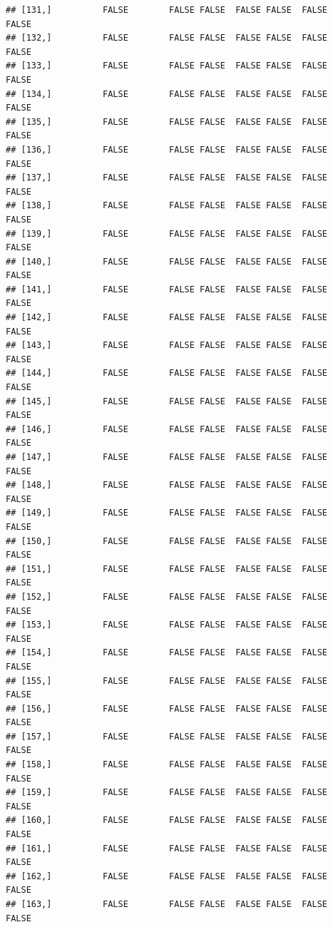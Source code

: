 \documentclass[
  english,
  man,floatsintext]{apa6}
\begin{document}
\begin{verbatim}
## [131,]          FALSE        FALSE FALSE  FALSE FALSE  FALSE            FALSE
## [132,]          FALSE        FALSE FALSE  FALSE FALSE  FALSE            FALSE
## [133,]          FALSE        FALSE FALSE  FALSE FALSE  FALSE            FALSE
## [134,]          FALSE        FALSE FALSE  FALSE FALSE  FALSE            FALSE
## [135,]          FALSE        FALSE FALSE  FALSE FALSE  FALSE            FALSE
## [136,]          FALSE        FALSE FALSE  FALSE FALSE  FALSE            FALSE
## [137,]          FALSE        FALSE FALSE  FALSE FALSE  FALSE            FALSE
## [138,]          FALSE        FALSE FALSE  FALSE FALSE  FALSE            FALSE
## [139,]          FALSE        FALSE FALSE  FALSE FALSE  FALSE            FALSE
## [140,]          FALSE        FALSE FALSE  FALSE FALSE  FALSE            FALSE
## [141,]          FALSE        FALSE FALSE  FALSE FALSE  FALSE            FALSE
## [142,]          FALSE        FALSE FALSE  FALSE FALSE  FALSE            FALSE
## [143,]          FALSE        FALSE FALSE  FALSE FALSE  FALSE            FALSE
## [144,]          FALSE        FALSE FALSE  FALSE FALSE  FALSE            FALSE
## [145,]          FALSE        FALSE FALSE  FALSE FALSE  FALSE            FALSE
## [146,]          FALSE        FALSE FALSE  FALSE FALSE  FALSE            FALSE
## [147,]          FALSE        FALSE FALSE  FALSE FALSE  FALSE            FALSE
## [148,]          FALSE        FALSE FALSE  FALSE FALSE  FALSE            FALSE
## [149,]          FALSE        FALSE FALSE  FALSE FALSE  FALSE            FALSE
## [150,]          FALSE        FALSE FALSE  FALSE FALSE  FALSE            FALSE
## [151,]          FALSE        FALSE FALSE  FALSE FALSE  FALSE            FALSE
## [152,]          FALSE        FALSE FALSE  FALSE FALSE  FALSE            FALSE
## [153,]          FALSE        FALSE FALSE  FALSE FALSE  FALSE            FALSE
## [154,]          FALSE        FALSE FALSE  FALSE FALSE  FALSE            FALSE
## [155,]          FALSE        FALSE FALSE  FALSE FALSE  FALSE            FALSE
## [156,]          FALSE        FALSE FALSE  FALSE FALSE  FALSE            FALSE
## [157,]          FALSE        FALSE FALSE  FALSE FALSE  FALSE            FALSE
## [158,]          FALSE        FALSE FALSE  FALSE FALSE  FALSE            FALSE
## [159,]          FALSE        FALSE FALSE  FALSE FALSE  FALSE            FALSE
## [160,]          FALSE        FALSE FALSE  FALSE FALSE  FALSE            FALSE
## [161,]          FALSE        FALSE FALSE  FALSE FALSE  FALSE            FALSE
## [162,]          FALSE        FALSE FALSE  FALSE FALSE  FALSE            FALSE
## [163,]          FALSE        FALSE FALSE  FALSE FALSE  FALSE            FALSE

\end{verbatim}
\end{document}
